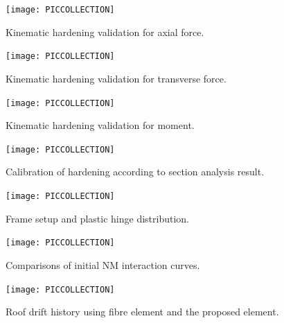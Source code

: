 \documentclass[3p,authoryear,11pt,fleqn,review]{elsarticle}
\begin{document}
\begin{figure}[p]
\centering\footnotesize
\texttt{[image: PICCOLLECTION]}
\caption{Kinematic hardening validation for axial force.}\label{fig:kin_hardening_a}
\end{figure}
\begin{figure}[p]
\centering\footnotesize
\texttt{[image: PICCOLLECTION]}
\caption{Kinematic hardening validation for transverse force.}\label{fig:kin_hardening_b}
\end{figure}
\begin{figure}[p]
\centering\footnotesize
\texttt{[image: PICCOLLECTION]}
\caption{Kinematic hardening validation for moment.}\label{fig:kin_hardening_c}
\end{figure}
\begin{figure}[p]
\centering\footnotesize
\texttt{[image: PICCOLLECTION]}
\caption{Calibration of hardening according to section analysis result.}\label{fig:nm_calibration}
\end{figure}
\begin{figure}[p]
\centering\footnotesize
\texttt{[image: PICCOLLECTION]}
\caption{Frame setup and plastic hinge distribution.}\label{fig:nm_frame_hinge}
\end{figure}
\begin{figure}[p]
\centering\footnotesize
\texttt{[image: PICCOLLECTION]}
\caption{Comparisons of initial NM interaction curves.}\label{fig:nm_surface_example}
\end{figure}
\begin{figure}[p]
\centering\footnotesize
\texttt{[image: PICCOLLECTION]}
\caption{Roof drift history using fibre element and the proposed element.}\label{fig:nm_frame_example}
\end{figure}
\end{document}
